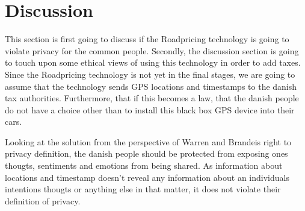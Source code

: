 \section{Discussion}
This section is first going to discuss if the Roadpricing technology is going to violate privacy for the common people. Secondly, the discussion section is going to touch upon some ethical views of using this technology in order to add taxes.
Since the Roadpricing technology is not yet in the final stages, we are going to assume that the technology sends GPS locations and timestamps to the danish tax authorities. Furthermore, that if this becomes a law, that the danish people do not have a choice other than to install this black box GPS device into their cars. 

Looking at the solution from the perspective of Warren and Brandeis right to privacy definition, the danish people should be protected from exposing ones thougts, sentiments and emotions from being shared. As information about locations and timestamp doesn't reveal any information about an individuals intentions thougts or anything else in that matter, it does not violate their definition of privacy. 

